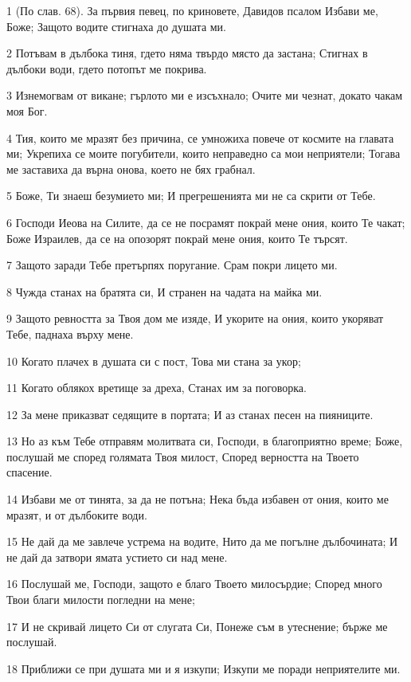 \par 1 (По слав. 68). За първия певец, по криновете, Давидов псалом Избави ме, Боже; Защото водите стигнаха до душата ми.
\par 2 Потъвам в дълбока тиня, гдето няма твърдо място да застана; Стигнах в дълбоки води, гдето потопът ме покрива.
\par 3 Изнемогвам от викане; гърлото ми е изсъхнало; Очите ми чезнат, докато чакам моя Бог.
\par 4 Тия, които ме мразят без причина, се умножиха повече от космите на главата ми; Укрепиха се моите погубители, които неправедно са мои неприятели; Тогава ме заставиха да върна онова, което не бях грабнал.
\par 5 Боже, Ти знаеш безумието ми; И прегрешенията ми не са скрити от Тебе.
\par 6 Господи Иеова на Силите, да се не посрамят покрай мене ония, които Те чакат; Боже Израилев, да се на опозорят покрай мене ония, които Те търсят.
\par 7 Защото заради Тебе претърпях поругание. Срам покри лицето ми.
\par 8 Чужда станах на братята си, И странен на чадата на майка ми.
\par 9 Защото ревността за Твоя дом ме изяде, И укорите на ония, които укоряват Тебе, паднаха върху мене.
\par 10 Когато плачех в душата си с пост, Това ми стана за укор;
\par 11 Когато облякох вретище за дреха, Станах им за поговорка.
\par 12 За мене приказват седящите в портата; И аз станах песен на пияниците.
\par 13 Но аз към Тебе отправям молитвата си, Господи, в благоприятно време; Боже, послушай ме според голямата Твоя милост, Според верността на Твоето спасение.
\par 14 Избави ме от тинята, за да не потъна; Нека бъда избавен от ония, които ме мразят, и от дълбоките води.
\par 15 Не дай да ме завлече устрема на водите, Нито да ме погълне дълбочината; И не дай да затвори ямата устието си над мене.
\par 16 Послушай ме, Господи, защото е благо Твоето милосърдие; Според много Твои благи милости погледни на мене;
\par 17 И не скривай лицето Си от слугата Си, Понеже съм в утеснение; бърже ме послушай.
\par 18 Приближи се при душата ми и я изкупи; Изкупи ме поради неприятелите ми.
